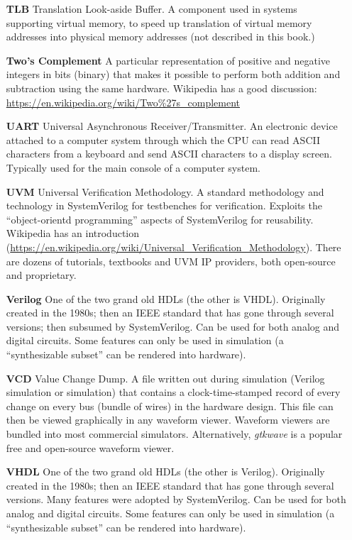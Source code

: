 \begin{itemize}
\item[\bf TLB] Translation Look-aside Buffer.  A component used in
  systems supporting virtual memory, to speed up translation of
  virtual memory addresses into physical memory addresses (not
  described in this book.)

\item[\bf Two's Complement] A particular representation of positive
  and negative integers in bits (binary) that makes it possible to
  perform both addition and subtraction using the same
  hardware. Wikipedia has a good discussion:
  \url{https://en.wikipedia.org/wiki/Two%27s_complement}

\item[\bf UART] Universal Asynchronous Receiver/Transmitter.  An
  electronic device attached to a computer system through which the
  CPU can read ASCII characters from a keyboard and send ASCII
  characters to a display screen.  Typically used for the main console
  of a computer system.

\item[\bf UVM] Universal Verification Methodology.  A standard
  methodology and technology in SystemVerilog for testbenches for
  verification. Exploits the ``object-orientd programming'' aspects of
  SystemVerilog for reusability. Wikipedia has an introduction
  (\url{https://en.wikipedia.org/wiki/Universal_Verification_Methodology}).
  There are dozens of tutorials, textbooks and UVM IP providers, both
  open-source and proprietary.

\item[\bf Verilog] One of the two grand old HDLs (the other is VHDL).
  Originally created in the 1980s; then an IEEE standard that has gone
  through several versions; then subsumed by SystemVerilog.  Can be
  used for both analog and digital circuits.  Some features can only
  be used in simulation (a ``synthesizable subset'' can be rendered
  into hardware).

\item[\bf VCD] Value Change Dump.  A file written out during
  simulation (Verilog simulation or {\BLUESIM} simulation) that contains
  a clock-time-stamped record of every change on every bus (bundle of
  wires) in the hardware design.  This file can then be viewed
  graphically in any waveform viewer.  Waveform viewers are bundled
  into most commercial simulators. Alternatively, \emph{gtkwave} is a
  popular free and open-source waveform viewer.

\item[\bf VHDL] One of the two grand old HDLs (the other is Verilog).
  Originally created in the 1980s; then an IEEE standard that has gone
  through several versions. Many features were adopted by
  SystemVerilog.  Can be used for both analog and digital circuits.
  Some features can only be used in simulation (a ``synthesizable
  subset'' can be rendered into hardware).

\end{itemize}

